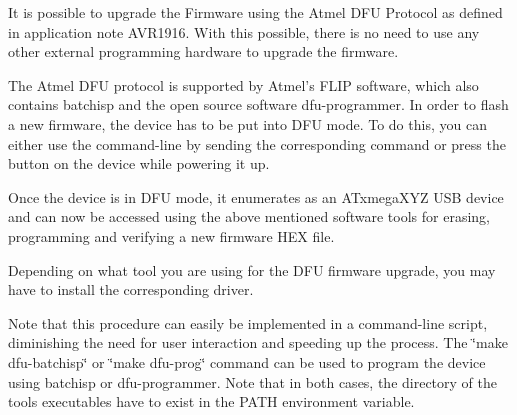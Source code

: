 It is possible to upgrade the Firmware using the Atmel D\-F\-U Protocol as defined in application note A\-V\-R1916. With this possible, there is no need to use any other external programming hardware to upgrade the firmware.

The Atmel D\-F\-U protocol is supported by Atmel's F\-L\-I\-P software, which also contains {\ttfamily batchisp} and the open source software {\ttfamily dfu-\/programmer}. In order to flash a new firmware, the device has to be put into D\-F\-U mode. To do this, you can either use the command-\/line by sending the corresponding command or press the button on the device while powering it up.

Once the device is in D\-F\-U mode, it enumerates as an A\-Txmega\-X\-Y\-Z U\-S\-B device and can now be accessed using the above mentioned software tools for erasing, programming and verifying a new firmware H\-E\-X file.

Depending on what tool you are using for the D\-F\-U firmware upgrade, you may have to install the corresponding driver.

Note that this procedure can easily be implemented in a command-\/line script, diminishing the need for user interaction and speeding up the process. The \char`\"{}make dfu-\/batchisp\char`\"{} or \char`\"{}make dfu-\/prog\char`\"{} command can be used to program the device using batchisp or dfu-\/programmer. Note that in both cases, the directory of the tools executables have to exist in the P\-A\-T\-H environment variable. 